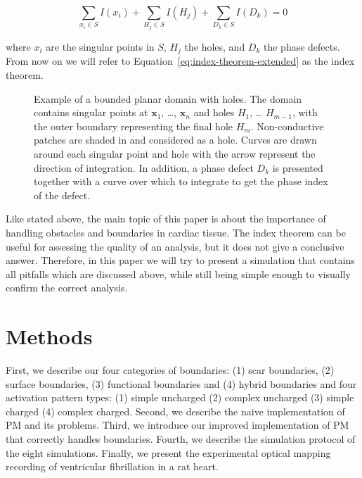 \documentclass[twocolumn]{article}
\begin{document}
\begin{equation}
  \sum_{x_i \in S} I(x_i) + \sum_{H_j \in S} I(H_j) + \sum_{D_k \in S} I(D_k)  = 0
  \label{eq:index-theorem-extended}
\end{equation}

\noindent where \(x_i\) are the singular points in \(S\),
\(H_j\) the holes,
and \(D_k\) the phase defects.
From now on we will refer to Equation~\ref{eq:index-theorem-extended} as the index theorem.

\begin{figure}[ht]
  \centering
  \caption{Example of a bounded planar domain with holes. The domain
    contains singular points at \(\pmb{x}_1\), \ldots, \(\pmb{x}_n\) and
    holes \(H_1\), \ldots{} \(H_{m-1}\), with the outer boundary
    representing the final hole \(H_m\).
    Non-conductive patches are shaded in and considered as a hole.
    Curves are drawn around each singular point and hole
    with the arrow represent the direction of integration.
    In addition, a phase defect $D_k$ is presented
    together with a curve over which to integrate to get the phase index of the defect.
  }
  \label{fig:index_calculation}
\end{figure}

\vspace{2em}

\noindent Like stated above, the main topic of this paper is about the importance
of handling obstacles and boundaries in cardiac tissue.
The index theorem can be useful for assessing the quality of an analysis,
but it does not give a conclusive answer.
Therefore, in this paper we will try to present a simulation
that contains all pitfalls which are discussed above,
while still being simple enough to visually confirm the correct analysis.

\section{Methods}

First, we describe our four categories of boundaries: (1) scar boundaries, (2) surface boundaries, (3) functional boundaries and (4) hybrid boundaries and four activation pattern types: (1) simple uncharged (2) complex uncharged (3) simple charged (4) complex charged.
Second, we describe the naive implementation of PM and its problems. Third, we introduce our improved implementation of PM that correctly handles boundaries. Fourth, we describe the simulation protocol of the eight simulations. Finally, we present the experimental optical mapping recording of ventricular fibrillation in a rat heart.
\end{document}
